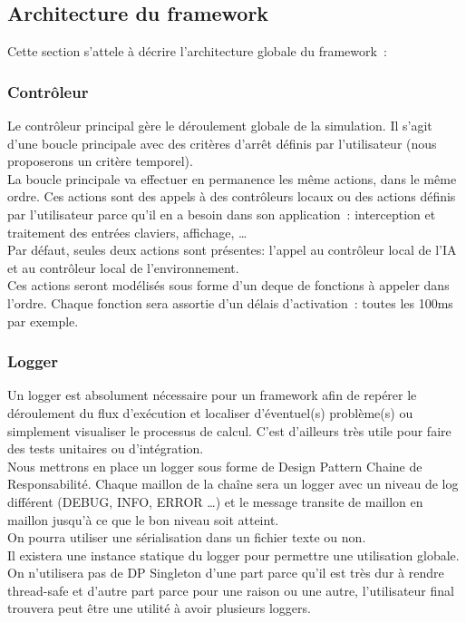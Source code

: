 \subsection{Architecture du framework}

Cette section s'attele à décrire l'architecture globale du framework~:

\subsubsection*{Contrôleur}

Le contrôleur principal gère le déroulement globale de la simulation. Il s'agit d'une boucle principale avec des critères d'arrêt définis par l'utilisateur (nous proposerons un critère temporel).\\
La boucle principale va effectuer en permanence les même actions, dans le même ordre. Ces actions sont des appels à des contrôleurs locaux ou des actions définis par l'utilisateur parce qu'il en a besoin dans son application~: interception et traitement des entrées claviers, affichage, \ldots \\
Par défaut, seules deux actions sont présentes: l'appel au contrôleur local de l'IA et au contrôleur local de l'environnement.\\

Ces actions seront modélisés sous forme d'un deque de fonctions à appeler dans l'ordre. Chaque fonction sera assortie d'un délais d'activation~: toutes les 100ms par exemple.

\subsubsection*{Logger}
Un logger est absolument nécessaire pour un framework afin de repérer le déroulement du flux d'exécution et localiser d'éventuel(s) problème(s) ou simplement visualiser le processus de calcul. C'est d'ailleurs très utile pour faire des tests unitaires ou d'intégration.\\
Nous mettrons en place un logger sous forme de Design Pattern Chaine de Responsabilité. Chaque maillon de la chaîne sera un logger avec un niveau de log différent (DEBUG, INFO, ERROR \ldots ) et le message transite de maillon en maillon jusqu'à ce que le bon niveau soit atteint.\\
On pourra utiliser une sérialisation dans un fichier texte ou non.\\

Il existera une instance statique du logger pour permettre une utilisation globale. On n'utilisera pas de DP Singleton d'une part parce qu'il est très dur à rendre thread-safe et d'autre part parce pour une raison ou une autre, l'utilisateur final trouvera peut être une utilité à avoir plusieurs loggers.

